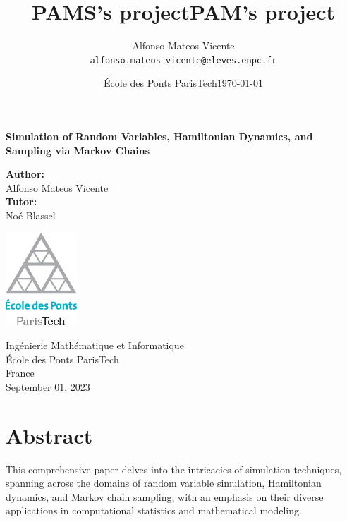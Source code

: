 \documentclass{report}
\title{PAMS's project} %
\author{Alfonso Mateos Vicente\\ \texttt{alfonso.mateos-vicente@eleves.enpc.fr}} %
\date{École des Ponts ParisTech} %
\title{PAM's project}
\date{\today}
\begin{document}
\begin{titlepage}
    \begin{center}
        \vspace*{1cm}
        
        \Huge
        \textbf{Simulation of Random Variables, Hamiltonian Dynamics, and Sampling via Markov Chains}
        
        \vspace{1.5cm}

        \Large
        \textbf{Author:} \\
        \vspace{0.25cm}
        \LARGE
        Alfonso Mateos Vicente \\
        \vspace{0.5cm}
        \Large
        \textbf{Tutor:} \\
        \vspace{0.25cm}
        \LARGE
        Noé Blassel

        \vfill
        
        \includegraphics[width=0.2\textwidth]{./logo-enpc.eps}
        
        \vspace{1cm}
        
        \normalsize
        Ingénierie Mathématique et Informatique \\
        École des Ponts ParisTech \\
        France \\
        September 01, 2023
    \end{center}
    \restoregeometry
\end{titlepage}


\newpage
\tableofcontents
\newpage

\chapter*{Abstract}

This comprehensive paper delves into the intricacies of simulation techniques, spanning across the domains of random variable simulation, Hamiltonian dynamics, and Markov chain sampling, with an emphasis on their diverse applications in computational statistics and mathematical modeling.
\end{document}

